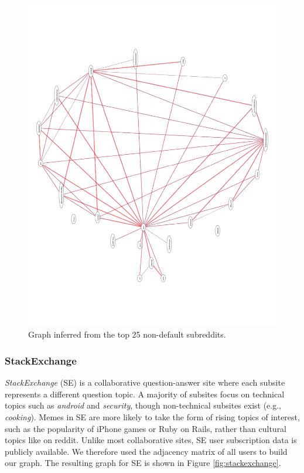 \documentclass{article} %
\begin{document}
\begin{figure}[htb]
\centering
\includegraphics[width=\textwidth]{reddit.pdf}
\caption{Graph inferred from the top 25 non-default subreddits.}
\label{fig:reddit}
\end{figure}

\subsubsection{StackExchange}
\textit{StackExchange} (SE) is a collaborative question-answer site where each subsite represents a different question topic. A majority of subsites focus on technical topics such as \textit{android} and \textit{security}, though non-technical subsites exist (e.g., \textit{cooking}). Memes in SE are more likely to take the form of rising topics of interest, such as the popularity of iPhone games or Ruby on Rails, rather than cultural topics like on reddit. Unlike most collaborative sites, SE user subscription data is publicly available. We therefore used the adjacency matrix of all users to build our graph. The resulting graph for SE is shown in Figure \ref{fig:stackexchange}.
\end{document}
